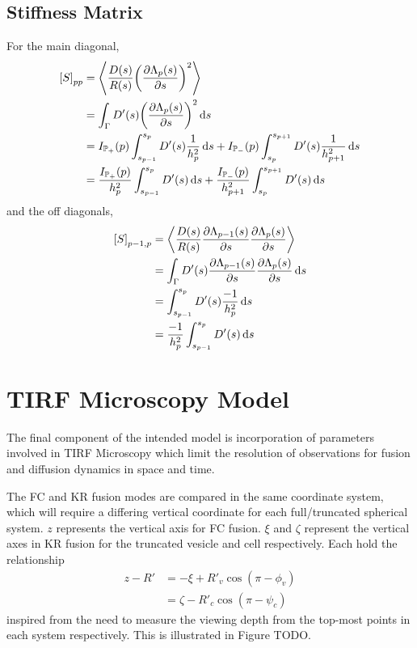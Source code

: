 \documentclass{report}
\newcommand\Par[1]{{ \left({#1}\right) }}
\newcommand\Brack[1]{{ \left[{#1}\right] }}
\newcommand\Angle[1]{{ \left\langle{#1}\right\rangle }}
\newcommand\bbP{{ \mathbb{P} }}
\newcommand\D{{ D' }}
\newcommand\R{{ R' }}
\newcommand\Rc{{ R'_c }}
\newcommand\Rv{{ R'_v }}
\newcommand{\ze}{{ \zeta }}
\begin{document}
\section{Stiffness Matrix}
For the main diagonal,
\begin{align*}
	\Brack{S}_{pp} &= \Angle{\frac{D(s)}{R(s)} \Par{\pdv{\Lambda_p(s)}{s}}^2} \\
	&= \int_\Gamma \D(s) \Par{\pdv{\Lambda_p(s)}{s}}^2 \dd{s} \\
	&= I_{\bbP_+}(p) \int_{s_{p-1}}^{s_p} \D(s) \frac{1}{h_p^2} \dd{s} + I_{\bbP_-}(p) \int_{s_p}^{s_{p+1}} \D(s) \frac{1}{h_{p+1}^2} \dd{s} \\
	&= \frac{I_{\bbP_+}(p)}{h_p^2} \int_{s_{p-1}}^{s_p} \D(s) \dd{s} + \frac{I_{\bbP_-}(p)}{h_{p+1}^2} \int_{s_p}^{s_{p+1}} \D(s) \dd{s}
\end{align*}
and the off diagonals,
\begin{align*}
	\Brack{S}_{p-1, p} &= \Angle{\frac{D(s)}{R(s)} \pdv{\Lambda_{p-1}(s)}{s} \pdv{\Lambda_p(s)}{s}} \\
	&= \int_\Gamma \D(s) \pdv{\Lambda_{p-1}(s)}{s} \pdv{\Lambda_p(s)}{s} \dd{s} \\
	&= \int_{s_{p-1}}^{s_p} \D(s) \frac{-1}{h_p^2} \dd{s} \\
	&= \frac{-1}{h_p^2} \int_{s_{p-1}}^{s_p} \D(s) \dd{s}
\end{align*}

\chapter{TIRF Microscopy Model}
The final component of the intended  model is incorporation of parameters involved in TIRF Microscopy which limit the resolution of observations for fusion and diffusion dynamics in space and time.

The FC and KR fusion modes are compared in the same coordinate system, which will require a differing vertical coordinate for each full/truncated spherical system. $z$ represents the vertical axis for FC fusion. $\xi$ and $\ze$ represent the vertical axes in KR fusion for the truncated vesicle and cell respectively. Each hold the relationship
\begin{align*}
	z - \R &=  -\xi + \Rv \cos(\pi - \phi_v) \\
	&= \ze - \Rc \cos(\pi - \psi_c)
\end{align*}
inspired from the need to measure the viewing depth from the top-most points in each system respectively. This is illustrated in Figure TODO.
\end{document}
